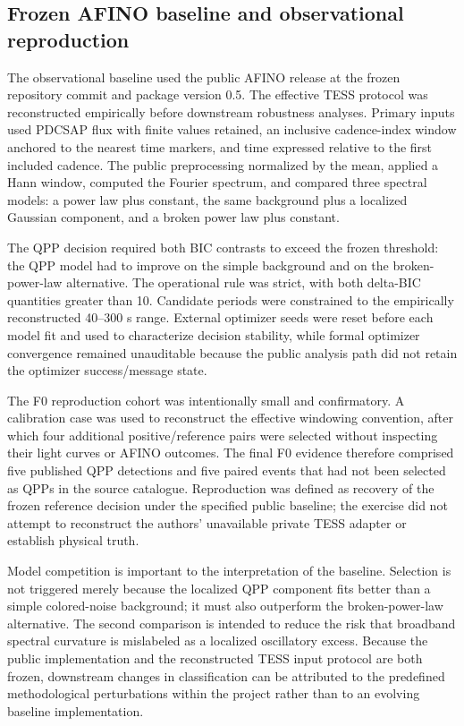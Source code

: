 \documentclass[11pt,a4paper]{article}
\begin{document}
\subsection{Frozen AFINO baseline and observational reproduction}
The observational baseline used the public AFINO release at the frozen repository commit and package version 0.5. The effective TESS protocol was reconstructed empirically before downstream robustness analyses. Primary inputs used PDCSAP flux with finite values retained, an inclusive cadence-index window anchored to the nearest time markers, and time expressed relative to the first included cadence. The public preprocessing normalized by the mean, applied a Hann window, computed the Fourier spectrum, and compared three spectral models: a power law plus constant, the same background plus a localized Gaussian component, and a broken power law plus constant.

The QPP decision required both BIC contrasts to exceed the frozen threshold: the QPP model had to improve on the simple background and on the broken-power-law alternative. The operational rule was strict, with both delta-BIC quantities greater than 10. Candidate periods were constrained to the empirically reconstructed 40--300 s range. External optimizer seeds were reset before each model fit and used to characterize decision stability, while formal optimizer convergence remained unauditable because the public analysis path did not retain the optimizer success/message state.

The F0 reproduction cohort was intentionally small and confirmatory. A calibration case was used to reconstruct the effective windowing convention, after which four additional positive/reference pairs were selected without inspecting their light curves or AFINO outcomes. The final F0 evidence therefore comprised five published QPP detections and five paired events that had not been selected as QPPs in the source catalogue. Reproduction was defined as recovery of the frozen reference decision under the specified public baseline; the exercise did not attempt to reconstruct the authors' unavailable private TESS adapter or establish physical truth.

Model competition is important to the interpretation of the baseline. Selection is not triggered merely because the localized QPP component fits better than a simple colored-noise background; it must also outperform the broken-power-law alternative. The second comparison is intended to reduce the risk that broadband spectral curvature is mislabeled as a localized oscillatory excess. Because the public implementation and the reconstructed TESS input protocol are both frozen, downstream changes in classification can be attributed to the predefined methodological perturbations within the project rather than to an evolving baseline implementation.
\end{document}
